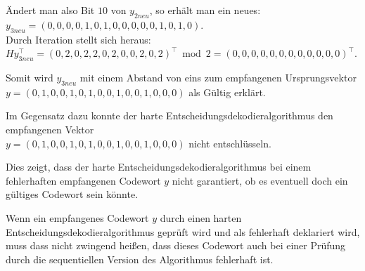 \begin{Beispiel}
    Ändert man also Bit $10$ von $y_{2neu}$, so erhält man ein neues:\\
    $y_{3neu} = (0,0,0,0,1,0,1,0,0,0,0,0,1,0,1,0).$\\
    
    Durch Iteration stellt sich heraus:\\
    $Hy_{3neu}^\intercal = (0,2,0,2,2,0,2,0,0,2,0,2)^\intercal \bmod 2 = (0,0,0,0,0,0,0,0,0,0,0,0)^\intercal$.\\
    \pagebreak
    
    Somit wird $y_{3neu}$ mit einem Abstand von eins zum empfangenen Ursprungsvektor $y = (0,1,0,0,1,0,1,0,0,1,0,0,1,0,0,0)$ als Gültig erklärt. 
     
    Im Gegensatz dazu konnte der harte Entscheidungsdekodieralgorithmus den empfangenen Vektor\\
    $y = (0,1,0,0,1,0,1,0,0,1,0,0,1,0,0,0)$ nicht entschlüsseln.
    
    Dies zeigt, dass der harte Entscheidungsdekodieralgorithmus
    bei einem fehlerhaften empfangenen Codewort $y$ nicht garantiert, 
    ob es eventuell doch ein gültiges Codewort sein könnte.
    
    Wenn ein empfangenes Codewort $y$ durch einen 
    harten Entscheidungsdekodieralgorithmus geprüft wird und 
    als fehlerhaft deklariert wird, muss dass nicht zwingend hei\ss{}en, dass dieses 
    Codewort auch bei einer Prüfung durch die sequentiellen Version des Algorithmus fehlerhaft ist.
    
\end{Beispiel}



